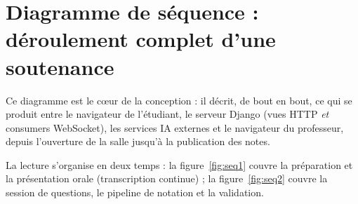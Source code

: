\documentclass[12pt,a4paper]{report}
\begin{document}
\section{Diagramme de séquence : déroulement complet d'une soutenance}
\label{sec:sequence}

Ce diagramme est le cœur de la conception : il décrit, de bout en bout, ce qui
se produit entre le navigateur de l'étudiant, le serveur Django (vues HTTP
\emph{et} consumers WebSocket), les services IA externes et le navigateur du
professeur, depuis l'ouverture de la salle jusqu'à la publication des notes.

La lecture s'organise en deux temps : la figure~\ref{fig:seq1} couvre la
préparation et la présentation orale (transcription continue) ; la
figure~\ref{fig:seq2} couvre la session de questions, le pipeline de notation
et la validation.
\end{document}
